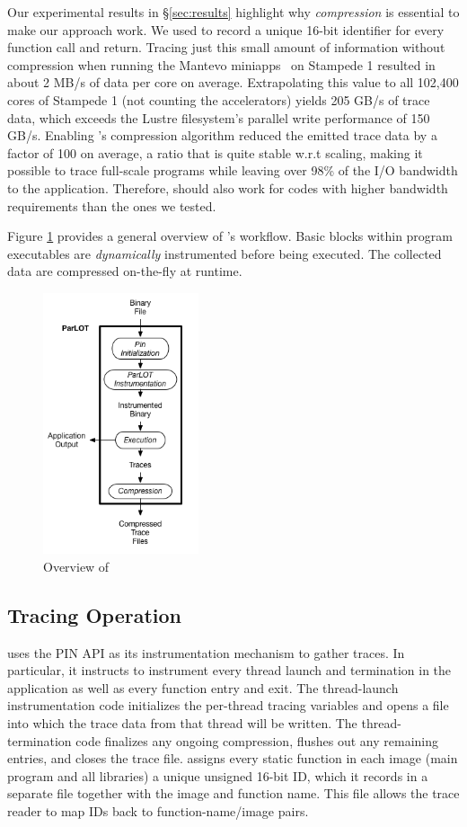 Our experimental results in \S\ref{sec:results} highlight why \textit{compression} is essential to make our approach work.
%
We used \parlot to record a unique 16-bit identifier for every function call and return.
%
Tracing just this small amount of information without compression when running the Mantevo miniapps~\cite{mantevo} on Stampede 1 resulted in about 2 MB/s of data per core on average.
%
Extrapolating this value to all 102,400 cores of Stampede 1 (not counting the accelerators) yields 205 GB/s of trace data, which exceeds the Lustre filesystem's parallel write performance of 150 GB/s.
%
Enabling \parlot's compression algorithm reduced the emitted trace data by a factor of 100 on average, a ratio that is quite stable w.r.t scaling, making it possible to trace full-scale programs while leaving over 98\% of the I/O bandwidth to the application. Therefore, \parlot should also work for codes with higher bandwidth requirements than the ones we tested.

Figure \ref{overview} provides a general overview of \parlot 's workflow.
%
Basic blocks within program executables are {\em dynamically} instrumented before being executed. The collected data are compressed on-the-fly at runtime.
%

\begin{figure}[!t]
\centering
\includegraphics[width=1.8in]{parlot/overview3.png}
\caption{Overview of \parlot}
\label{overview}
\end{figure}


\subsection{Tracing Operation}
\label{subsec:traceOp}

\parlot uses the PIN API as its instrumentation mechanism to gather traces. In particular, it instructs \pin to instrument every thread launch and termination in the application as well as every function entry and exit. The thread-launch instrumentation code initializes the per-thread tracing variables and opens a file into which the trace data from that thread will be written. The thread-termination code finalizes any ongoing compression, flushes out any remaining entries, and closes the trace file. \parlot assigns every static function in each image (main program and all libraries) a unique unsigned 16-bit ID, which it records in a separate file together with the image and function name. This file allows the trace reader to map IDs back to function-name/image pairs.

